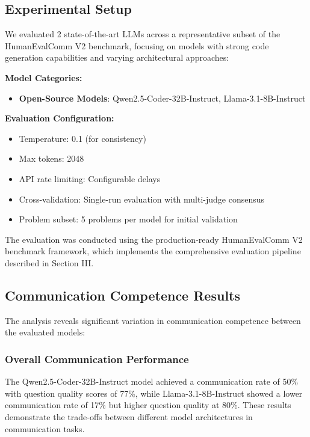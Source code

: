 \documentclass[conference]{IEEEtran}
\begin{document}
\subsection{Experimental Setup}

We evaluated 2 state-of-the-art LLMs across a representative subset of the HumanEvalComm V2 benchmark, focusing on models with strong code generation capabilities and varying architectural approaches:

\textbf{Model Categories:}

\begin{itemize}
    \item \textbf{Open-Source Models}: Qwen2.5-Coder-32B-Instruct, Llama-3.1-8B-Instruct
\end{itemize}

\textbf{Evaluation Configuration:}

\begin{itemize}
    \item Temperature: 0.1 (for consistency)
    \item Max tokens: 2048
    \item API rate limiting: Configurable delays
    \item Cross-validation: Single-run evaluation with multi-judge consensus
    \item Problem subset: 5 problems per model for initial validation
\end{itemize}

The evaluation was conducted using the production-ready HumanEvalComm V2 benchmark framework, which implements the comprehensive evaluation pipeline described in Section III.

\subsection{Communication Competence Results}

The analysis reveals significant variation in communication competence between the evaluated models:

\subsubsection{Overall Communication Performance}

The Qwen2.5-Coder-32B-Instruct model achieved a communication rate of 50\% with question quality scores of 77\%, while Llama-3.1-8B-Instruct showed a lower communication rate of 17\% but higher question quality at 80\%. These results demonstrate the trade-offs between different model architectures in communication tasks.
\end{document}
